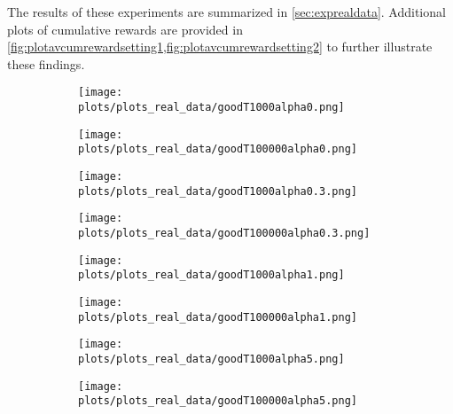 \begin{APPENDICES}
The results of these experiments are summarized in \cref{sec:exprealdata}. Additional plots of cumulative rewards are provided in \cref{fig:plotavcumrewardsetting1,fig:plotavcumrewardsetting2} to further illustrate these findings.






\begin{figure}[htb]
\begin{centering}
\begin{subfigure}{.48\textwidth}
  \centering
  \texttt{[image: plots/plots\_real\_data/goodT1000alpha0.png]}
\end{subfigure}%
\begin{subfigure}{.48\textwidth}
  \centering
  \texttt{[image: plots/plots\_real\_data/goodT100000alpha0.png]}
\end{subfigure}
\begin{subfigure}{.48\textwidth}
  \centering
  \texttt{[image: plots/plots\_real\_data/goodT1000alpha0.3.png]}
\end{subfigure}%
\begin{subfigure}{.48\textwidth}
  \centering
  \texttt{[image: plots/plots\_real\_data/goodT100000alpha0.3.png]}
\end{subfigure}
\begin{subfigure}{.48\textwidth}
  \centering
  \texttt{[image: plots/plots\_real\_data/goodT1000alpha1.png]}
\end{subfigure}%
\begin{subfigure}{.48\textwidth}
  \centering
  \texttt{[image: plots/plots\_real\_data/goodT100000alpha1.png]}
\end{subfigure}
\begin{subfigure}{.48\textwidth}
  \centering
  \texttt{[image: plots/plots\_real\_data/goodT1000alpha5.png]}
\end{subfigure}%
\begin{subfigure}{.48\textwidth}
  \centering
  \texttt{[image: plots/plots\_real\_data/goodT100000alpha5.png]}
\end{subfigure}


\end{centering}
\end{figure}
\end{APPENDICES}
